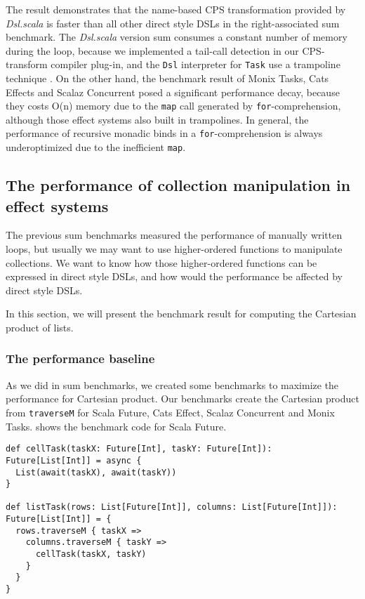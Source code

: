 The result demonstrates that the name-based CPS transformation provided by \textit{Dsl.scala} is faster than all other direct style DSLs in the right-associated sum benchmark. The \textit{Dsl.scala} version sum consumes a constant number of memory during the loop, because we implemented a tail-call detection in our CPS-transform compiler plug-in, and the \lstinline{Dsl} interpreter for \lstinline{Task} use a trampoline technique \cite{tarditi1992no}. On the other hand, the benchmark result of Monix Tasks, Cats Effects and Scalaz Concurrent posed a significant performance decay, because they costs O(n) memory due to the \lstinline{map} call generated by \lstinline{for}-comprehension, although those effect systems also built in trampolines. In general, the performance of recursive monadic binds in a \lstinline{for}-comprehension is always underoptimized due to the inefficient \lstinline{map}.

\subsection{The performance of collection manipulation in effect systems}

The previous sum benchmarks measured the performance of manually written loops, but usually we may want to use higher-ordered functions to manipulate collections. We want to know how those higher-ordered functions can be expressed in direct style DSLs, and how would the performance be affected by direct style DSLs.

In this section, we will present the benchmark result for computing the Cartesian product of lists.

\subsubsection{The performance baseline}

As we did in sum benchmarks, we created some benchmarks to maximize the performance for Cartesian product. Our benchmarks create the Cartesian product from \lstinline{traverseM} for Scala Future, Cats Effect, Scalaz Concurrent and Monix Tasks.  shows the benchmark code for Scala Future.

\begin{lstlisting}[float=htbp,caption={Cartesian product for Scala Future, based on Scalaz's \lstinline{traverseM}},label={RawCartesianPruduct.future}]
def cellTask(taskX: Future[Int], taskY: Future[Int]): Future[List[Int]] = async {
  List(await(taskX), await(taskY))
}

def listTask(rows: List[Future[Int]], columns: List[Future[Int]]): Future[List[Int]] = {
  rows.traverseM { taskX =>
    columns.traverseM { taskY =>
      cellTask(taskX, taskY)
    }
  }
}
\end{lstlisting}

